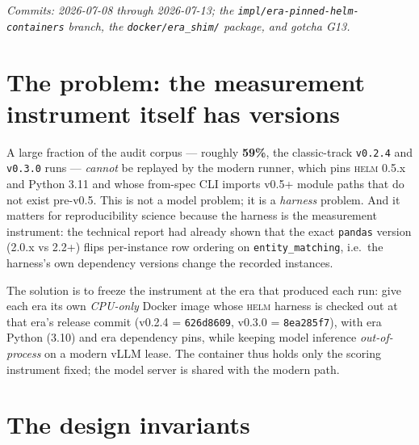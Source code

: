 \documentclass[11pt]{report}
\newcommand{\code}[1]{\texttt{#1}}
\begin{document}
\emph{Commits: 2026-07-08 through 2026-07-13; the
\code{impl/era-pinned-helm-containers} branch, the \code{docker/era\_shim/}
package, and gotcha G13.}

\section{The problem: the measurement instrument itself has versions}

A large fraction of the audit corpus --- roughly \textbf{59\%}, the classic-track
\code{v0.2.4} and \code{v0.3.0} runs --- \emph{cannot} be replayed by the modern
runner, which pins \textsc{helm} 0.5.x and Python 3.11 and whose from-spec CLI
imports v0.5+ module paths that do not exist pre-v0.5. This is not a model problem;
it is a \emph{harness} problem. And it matters for reproducibility science because
the harness is the measurement instrument: the technical report had already shown
that the exact \code{pandas} version (2.0.x vs 2.2+) flips per-instance row
ordering on \code{entity\_matching}, i.e.\ the harness's own dependency versions
change the recorded instances.

The solution is to freeze the instrument at the era that produced each run: give
each era its own \emph{CPU-only} Docker image whose \textsc{helm} harness is
checked out at that era's release commit (v0.2.4 = \code{626d8609}, v0.3.0 =
\code{8ea285f7}), with era Python (3.10) and era dependency pins, while keeping
model inference \emph{out-of-process} on a modern vLLM lease. The container thus
holds only the scoring instrument fixed; the model server is shared with the
modern path.

\section{The design invariants}
\end{document}
